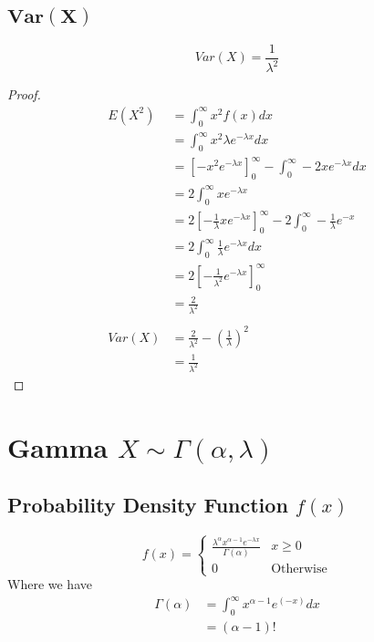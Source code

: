 \documentclass[12pt]{article}
\begin{document}
\subsection{$\bm{Var(X)}$}

\begin{equation*}
  Var(X)= \frac{1}{\lambda^{2}}
\end{equation*}
\begin{proof}
  \begin{align*}
    E(X^{2}) &= \int_{0}^{\infty} x^{2} f(x) dx \\
             &= \int_{0}^{\infty} x^{2} \lambda e^{-\lambda x} dx \\
             &= \left[-x^{2}e^{-\lambda x} \right]_{0}^{\infty} - \int_{0}^{\infty}-2x e^{-\lambda x} dx \\
             &= 2\int_{0}^{\infty} xe^{-\lambda x} \\
             &= 2\left[-\frac{1}{\lambda}xe^{-\lambda x} \right]_{0}^{\infty} -2 \int_{0}^{\infty}-\frac{1}{\lambda}e^{-x} \\
             &= 2\int_{0}^{\infty} \frac{1}{\lambda}e^{-\lambda x} dx \\
             &= 2\left[-\frac{1}{\lambda^{2}}e^{-\lambda x} \right]_{0}^{\infty} \\
             &= \frac{2}{\lambda^{2}} \\ \\
    Var(X) &= \frac{2}{\lambda^{2}} - \left(\frac{1}{\lambda}\right)^{2} \\
           &= \frac{1}{\lambda^{2}}
  \end{align*}
\end{proof}
\newpage
\section{Gamma $X \sim \Gamma(\alpha,\lambda)$}
\subsection{Probability Density Function $f(x)$}

\begin{equation*}
  f(x) =
  \begin{cases}
     \frac{\lambda^{\alpha} x^{\alpha -1} e^{-\lambda x}}{\Gamma(\alpha)} & x \geq 0 \\
     0 & \text{Otherwise}
  \end{cases}
\end{equation*}
Where we have
\begin{align*}
  \Gamma(\alpha) &= \int_{0}^{\infty}x^{\alpha -1}e^(-x) dx \\
                 &= (\alpha -1)!
\end{align*}
\end{document}
